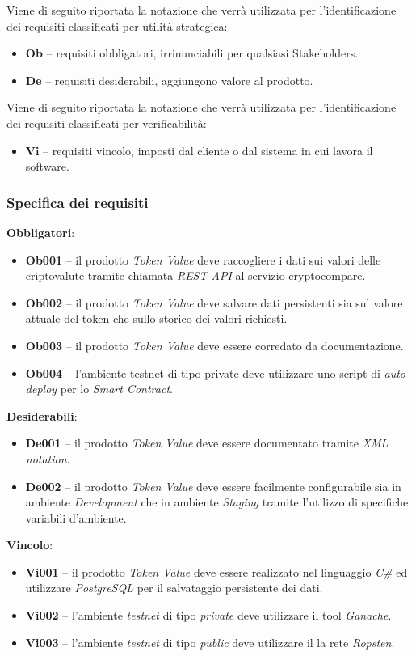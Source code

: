 \documentclass[11pt]{thesistemp}
\begin{document}
Viene di seguito riportata la notazione che verrà utilizzata per l’identificazione dei requisiti classificati per utilità strategica: 
\begin{itemize}
	\item \textbf{Ob} – requisiti obbligatori, irrinunciabili per qualsiasi Stakeholders.
	\item \textbf{De} – requisiti desiderabili, aggiungono valore al prodotto.
\end{itemize}
Viene di seguito riportata la notazione che verrà utilizzata per l’identificazione dei requisiti classificati per verificabilità: 
\begin{itemize}
	\item \textbf{Vi} – requisiti vincolo, imposti dal cliente o dal sistema in cui lavora il software.
\end{itemize}

\subsubsection{Specifica dei requisiti}

\textbf{Obbligatori}:
\begin{itemize}
	\item \textbf{Ob001} – il prodotto \textit{Token Value} deve raccogliere i dati sui valori delle criptovalute tramite chiamata \textit{REST API} al servizio cryptocompare.
	\item \textbf{Ob002} – il prodotto \textit{Token Value} deve salvare dati persistenti sia sul valore attuale del token che sullo storico dei valori richiesti.
	\item \textbf{Ob003} – il prodotto \textit{Token Value} deve essere corredato da documentazione.
	\item \textbf{Ob004} – l’ambiente testnet di tipo private deve utilizzare uno script di \textit{auto-deploy} per lo \textit{Smart Contract}.
\end{itemize}
\textbf{Desiderabili}:
\begin{itemize}
	\item \textbf{De001} – il prodotto \textit{Token Value} deve essere documentato tramite\textit{ XML notation}.
	\item \textbf{De002} – il prodotto \textit{Token Value} deve essere facilmente configurabile sia in ambiente \textit{Development} che in ambiente \textit{Staging} tramite l’utilizzo di specifiche variabili d’ambiente.
\end{itemize}
\textbf{Vincolo}:
\begin{itemize}
	\item \textbf{Vi001} – il prodotto \textit{Token Value} deve essere realizzato nel linguaggio \textit{C\#} ed utilizzare \textit{PostgreSQL} per il salvataggio persistente dei dati.
	\item \textbf{Vi002} – l’ambiente \textit{testnet} di tipo \textit{private} deve utilizzare il tool \textit{Ganache}.
	\item \textbf{Vi003} – l’ambiente \textit{testnet} di tipo \textit{public} deve utilizzare il la rete \textit{Ropsten}.
\end{itemize}
\pagebreak
\end{document}
